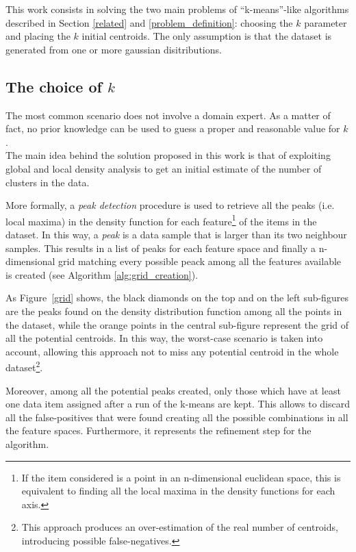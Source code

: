This work consists in solving the two main problems of ``k-means''-like
algorithms described in Section \ref{related} and \ref{problem_definition}:
choosing the $k$ parameter and placing the $k$ initial centroids.
The only assumption is that the dataset is generated from one or more gaussian
disitributions.


\subsection{The choice of $k$}
The most common scenario does not involve a domain expert. As a matter of fact,
no prior knowledge can be used to guess a proper and reasonable value for $k$.\\
The main idea behind the solution proposed in this work is that of exploiting global
and local density analysis to get an initial estimate of the number of clusters
in the data.

More formally, a \emph{peak detection} procedure is used to retrieve
all the peaks (i.e. local maxima) in the density function for each feature\footnote{If
the item considered is a point in an n-dimensional euclidean space, this is equivalent to
finding all the local maxima in the density functions for each axis.} of the items in
the dataset. In this way, a \emph{peak} is a data sample that is larger than
its two neighbour samples.
This results in a list of peaks for each feature space and finally a n-dimensional grid
matching every possible peack among all the features available is created
(see Algorithm \ref{alg:grid_creation}).


As Figure~\ref{grid} shows, the black diamonds on the top and on
the left sub-figures are the peaks found on the density distribution function among all
the points in the dataset, while the orange points in the central sub-figure represent the
grid of all the potential centroids.
In this way, the worst-case scenario is taken into account, allowing this approach not
to miss any potential centroid in the whole dataset\footnote{This approach produces an
over-estimation of the real number of centroids, introducing possible false-negatives.}.

\begin{figure*}
  \caption{The grid with all the potential centroids computed from the peaks.}
  \label{grid}
\end{figure*}

Moreover, among all the potential peaks created, only those which have at least one data
item assigned after a run of the k-means are kept. This allows to discard all the
false-positives that were found creating all the possible combinations in all the feature spaces.
Furthermore, it represents the refinement step for the algorithm.

